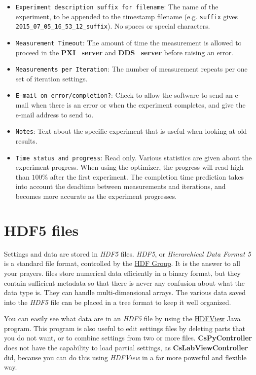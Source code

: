 \documentclass[pdftex,11pt,letterpaper]{article}
\begin{document}
\begin{itemize}
\item \texttt{Experiment description suffix for filename}:  The name of the experiment, to be appended to the timestamp filename (e.g. \texttt{suffix} gives \texttt{2015\_07\_05\_16\_53\_12\_suffix}).  No spaces or special characters.
\item \texttt{Measurement Timeout}:  The amount of time the measurement is allowed to proceed in the \textbf{PXI\_server} and \textbf{DDS\_server} before raising an error.
\item \texttt{Measurements per Iteration}:  The number of measurement repeats per one set of iteration settings.
\item \texttt{E-mail on error/completion?}:  Check to allow the software to send an e-mail when there is an error or when the experiment completes, and give the e-mail address to send to.
\item \texttt{Notes}:  Text about the specific experiment that is useful when looking at old results.
\item \texttt{Time status and progress}:  Read only.  Various statistics are given about the experiment progress.  When using the optimizer, the progress will read high than $100\%$ after the first experiment.  The completion time prediction takes into account the deadtime between measurements and iterations, and becomes more accurate as the experiment progresses.
\end{itemize}

\section{HDF5 files}

Settings and data are stored in \textit{HDF5} files.  \textit{HDF5}, or \textit{Hierarchical Data Format 5} is a standard file format, controlled by the \href{https://www.hdfgroup.org/HDF5/}{HDF Group}.  It is the answer to all your prayers.   files store numerical data efficiently in a binary format, but they contain sufficient metadata so that there is never any confusion about what the data type is.  They can handle multi-dimensional arrays.  The various data saved into the \textit{HDF5} file can be placed in a tree format to keep it well organized.

You can easily see what data are in an \textit{HDF5} file by using the \href{https://www.hdfgroup.org/HDF5/}{HDFView} Java program.  This program is also useful to edit settings files by deleting parts that you do not want, or to combine settings from two or more files.  \textbf{CsPyController} does not have the capability to load partial settings, as \textbf{CsLabViewController} did, because you can do this using \textit{HDFView} in a far more powerful and flexible way.
\end{document}
